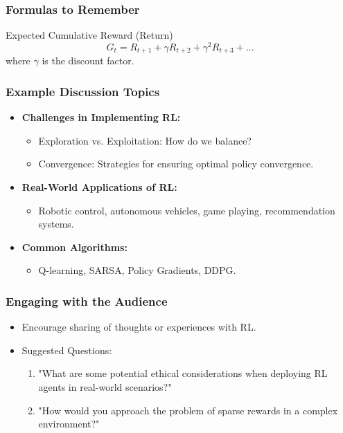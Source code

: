 \documentclass[aspectratio=169]{beamer}
\begin{document}
\begin{frame}[fragile]
    \frametitle{Formulas to Remember}
    \begin{block}{Expected Cumulative Reward (Return)}
        \begin{equation}
        G_t = R_{t+1} + \gamma R_{t+2} + \gamma^2 R_{t+3} + \ldots 
        \end{equation}
        where $\gamma$ is the discount factor.
    \end{block}
\end{frame}

\begin{frame}[fragile]
    \frametitle{Example Discussion Topics}
    \begin{itemize}
        \item \textbf{Challenges in Implementing RL:}
            \begin{itemize}
                \item Exploration vs. Exploitation: How do we balance?
                \item Convergence: Strategies for ensuring optimal policy convergence.
            \end{itemize}
        
        \item \textbf{Real-World Applications of RL:}
            \begin{itemize}
                \item Robotic control, autonomous vehicles, game playing, recommendation systems.
            \end{itemize}
        
        \item \textbf{Common Algorithms:}
            \begin{itemize}
                \item Q-learning, SARSA, Policy Gradients, DDPG.
            \end{itemize}
    \end{itemize}
\end{frame}

\begin{frame}[fragile]
    \frametitle{Engaging with the Audience}
    \begin{itemize}
        \item Encourage sharing of thoughts or experiences with RL.
        \item Suggested Questions:
            \begin{enumerate}
                \item "What are some potential ethical considerations when deploying RL agents in real-world scenarios?"
                \item "How would you approach the problem of sparse rewards in a complex environment?"
            \end{enumerate}
    \end{itemize}
\end{frame}
\end{document}
